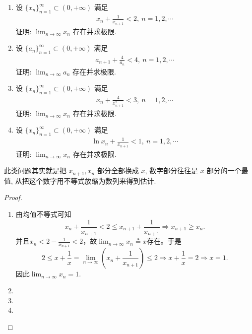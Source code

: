 \documentclass[../../main.tex]{subfiles}%
\begin{document}
\begin{example}
\begin{enumerate}
\item 设 $\{x_n\}_{n=1}^{\infty} \subset (0,+\infty)$ 满足
\begin{align*}
x_n + \frac{1}{x_{n+1}} < 2,\ n = 1,2,\cdots
\end{align*}
证明: $\lim_{n \to \infty} x_n$ 存在并求极限.
\item 设 $\{a_n\}_{n=1}^{\infty} \subset (0,+\infty)$ 满足
\begin{align*}
a_{n+1} + \frac{4}{a_n} < 4,\ n = 1,2,\cdots
\end{align*}
证明: $\lim_{n \to \infty} a_n$ 存在并求极限.
\item 设 $\{x_n\}_{n=1}^{\infty} \subset (0,+\infty)$ 满足
\begin{align*}
x_n + \frac{4}{x_{n+1}^2} < 3,\ n = 1,2,\cdots
\end{align*}
证明: $\lim_{n \to \infty} x_n$ 存在并求极限.
\item 设 $\{x_n\}_{n=1}^{\infty} \subset (0,+\infty)$ 满足
\begin{align*}
\ln x_n + \frac{1}{x_{n+1}} < 1,\ n = 1,2,\cdots
\end{align*}
证明: $\lim_{n \to \infty} x_n$ 存在并求极限.
\end{enumerate}
\end{example}
\begin{note}
此类问题其实就是把 $x_{n+1}, x_n$ 部分全部换成 $x$, 数字部分往往是 $x$ 部分的一个最值, 从把这个数字用不等式放缩为数列来得到估计.
\end{note}
\begin{proof}
\begin{enumerate}
\item 由均值不等式可知
$$x_n + \frac{1}{x_{n+1}} < 2 \leqslant x_{n+1} + \frac{1}{x_{n+1}} \Rightarrow x_{n+1} \geqslant x_n.$$
并且$x_n < 2 - \frac{1}{x_{n+1}} < 2$，故$\lim_{n \to \infty} x_n \triangleq x$存在。于是
$$2 \leqslant x + \frac{1}{x} = \lim_{n \to \infty} \left( x_n + \frac{1}{x_{n+1}} \right) \leqslant 2 \Rightarrow x + \frac{1}{x} = 2 \Rightarrow x = 1.$$
因此$\lim_{n \to \infty} x_n = 1.$

\item 

\item 

\item 
\end{enumerate}
\end{proof}
\end{document}
